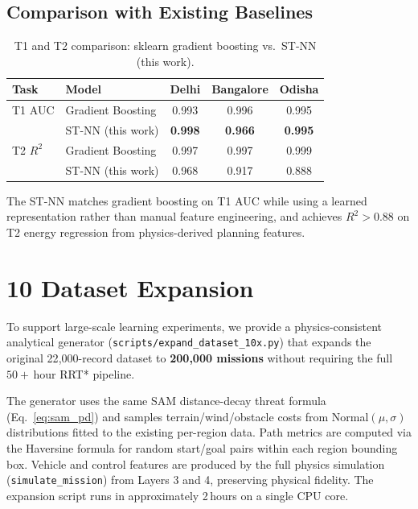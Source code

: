 \documentclass{article}
\begin{document}
\subsection{Comparison with Existing Baselines}
\label{sec:comparison}

\begin{table}[h]
\centering
\caption{T1 and T2 comparison: sklearn gradient boosting vs.\ ST-NN (this work).}
\label{tab:comparison}
\begin{tabular}{llccc}
\toprule
Task & Model & Delhi & Bangalore & Odisha \\
\midrule
T1 AUC & Gradient Boosting \citep{baseline_experiments} & 0.993 & 0.996 & 0.995 \\
       & ST-NN (this work) & \textbf{0.998} & \textbf{0.966} & \textbf{0.995} \\
\midrule
T2 $R^2$ & Gradient Boosting \citep{baseline_experiments} & 0.997 & 0.997 & 0.999 \\
         & ST-NN (this work) & 0.968 & 0.917 & 0.888 \\
\bottomrule
\end{tabular}
\end{table}

The ST-NN matches gradient boosting on T1 AUC while using a learned
representation rather than manual feature engineering, and achieves
$R^2 > 0.88$ on T2 energy regression from physics-derived planning features.

\section{10\texttimes{} Dataset Expansion}
\label{sec:expansion}

To support large-scale learning experiments, we provide a physics-consistent
analytical generator (\texttt{scripts/expand\_dataset\_10x.py}) that expands
the original 22{,}000-record dataset to \textbf{200{,}000 missions} without
requiring the full $50+$\,hour RRT* pipeline.

The generator uses the same SAM distance-decay threat formula (Eq.~\ref{eq:sam_pd})
and samples terrain/wind/obstacle costs from Normal$(\mu, \sigma)$ distributions
fitted to the existing per-region data. Path metrics are computed via the
Haversine formula for random start/goal pairs within each region bounding box.
Vehicle and control features are produced by the full physics simulation
(\texttt{simulate\_mission}) from Layers 3 and 4, preserving physical fidelity.
The expansion script runs in approximately 2\,hours on a single CPU core.
\end{document}
